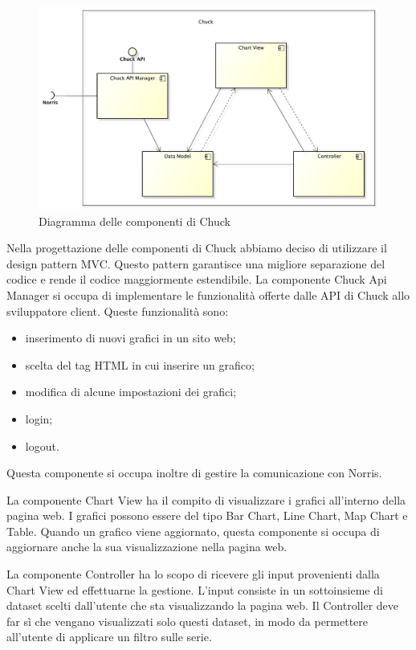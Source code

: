 	\begin{figure}[H]\centering
        \includegraphics[width=\textwidth]{SpecificaTecnica/Pics/ComponentiChuck}
        \caption{Diagramma delle componenti di Chuck}
    \end{figure}
	Nella progettazione delle componenti di Chuck abbiamo deciso di utilizzare il design pattern MVC. Questo pattern garantisce una migliore separazione del codice e rende il codice maggiormente estendibile. 
    		La componente Chuck Api Manager si occupa di implementare le funzionalità offerte dalle API di Chuck allo sviluppatore client. Queste funzionalità sono:
    		\begin{itemize}
						\item inserimento di nuovi grafici in un sito web;
						\item scelta del tag HTML in cui inserire un grafico;
						\item modifica di alcune impostazioni dei grafici;
						\item login;
						\item logout.
			\end{itemize}
    		Questa componente si occupa inoltre di gestire la comunicazione con Norris.
    		
    	La componente Chart View ha il compito di visualizzare i grafici all'interno della pagina web. I grafici possono essere del tipo Bar Chart, Line Chart, Map Chart e Table. Quando un grafico viene aggiornato, questa componente si occupa di aggiornare anche la sua visualizzazione nella pagina web.

    	La componente Controller ha lo scopo di ricevere gli input provenienti dalla Chart View ed effettuarne la gestione. L'input consiste in un sottoinsieme di dataset scelti dall'utente che sta visualizzando la pagina web. Il Controller deve far sì che vengano visualizzati solo questi dataset, in modo da permettere all'utente di applicare un filtro sulle serie.

